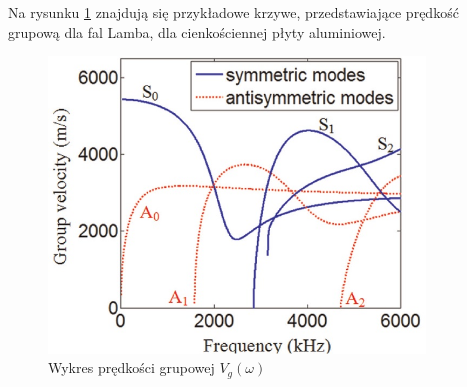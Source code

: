Na rysunku \ref{fig:predkosc_grupow_wykres} znajdują się przykładowe krzywe, przedstawiające prędkość grupową dla fal Lamba, dla cienkościennej płyty aluminiowej.

\begin{figure}[h]
\centering
\includegraphics[width=10cm]{Zdjecia/2/predkosc_grupowa_wykres}
\caption{Wykres prędkości grupowej \(V_g(\omega)\) \cite{bartek_tian}}
\label{fig:predkosc_grupow_wykres}
\end{figure}





























